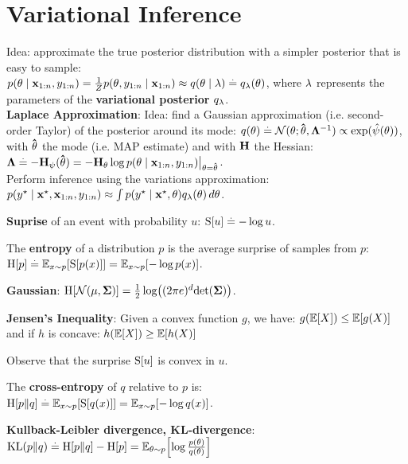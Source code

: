 \section{Variational Inference}
Idea: approximate the true posterior distribution with a simpler posterior that is easy to sample: \\$p(\mathbf{\theta} \mid \mathbf{x}_{1:n}, y_{1:n}) = \frac{1}{Z} p(\mathbf{\theta}, y_{1:n} \mid \mathbf{x}_{1:n}) \approx q(\mathbf{\theta} \mid \mathbf{\lambda}) \overset{.}{=} q_{\mathbf{\lambda}}(\mathbf{\theta})$, where $\mathbf{\lambda}$ represents the parameters of the \textbf{variational posterior} $q_{\mathbf{\lambda}}$.\\
\textbf{Laplace Approximation}: Idea: find a Gaussian approximation (i.e. second-order Taylor) of the posterior around its mode:
$q(\vtheta) \defeq \N[\vtheta]{\vthetahat}{\inv{\mLambda}} \propto \exp(\hat{\psi}(\vtheta))$, with $\mathbf{\hat{\theta}}$ the mode (i.e. MAP estimate) and with $\mathbf{H}$ the Hessian: $\mathbf{\Lambda} \overset{.}{=} - \mathbf{H}_\psi(\mathbf{\hat{\theta}}) = - \mathbf{H}_{\mathbf{\theta}} \log p(\mathbf{\theta} \mid \mathbf{x}_{1:n}, y_{1:n}) \bigl|_{\mathbf{\theta} = \mathbf{\hat{\theta}}}$. \\
Perform inference using the variations approximation: $p(y^\star \mid \mathbf{x^\star}, \mathbf{x}_{1:n}, y_{1:n})  \approx \int p(y^\star \mid \mathbf{x^\star}, \mathbf{\theta}) q_{\mathbf{\lambda}}(\mathbf{\theta}) \,d\mathbf{\theta}$.
\begin{framed}
    \textbf{Suprise} of an event with probability $u$: $\S{u} \defeq - \log u$.
\end{framed}
\begin{framed}
    The \textbf{entropy} of a distribution $p$ is the average surprise of samples from $p$:\\
    $\H{p} \defeq \E[x \sim p]{\S{p(x)}} = \E[x \sim p]{- \log p(x)}$.
\end{framed}
\textbf{Gaussian}: $\H{\N{\vmu}{\mSigma}} = \frac{1}{2} \log \parentheses*{(2 \pi e)^d \det{\mSigma}}$.
\begin{framed}
    \textbf{Jensen's Inequality}: Given a convex function $g$, we have:
    $g(\E{X}) \leq \E{g(X)}$ and if $h$ is concave:  $h(\E{X}) \geq \E{h(X)}$
\end{framed}
Observe that the surprise $\S{u}$ is convex in $u$.
\begin{framed}
    The \textbf{cross-entropy} of $q$ relative to $p$ is: \\
    $\crH{p}{q} \defeq \E[x \sim p]{\S{q(x)}} = \E[x \sim p]{- \log q(x)}$.
\end{framed}
\begin{framed}
    \textbf{Kullback-Leibler divergence, KL-divergence}:
    $\KL{p}{q} \defeq \crH{p}{q} - \H{p} = \E[\vtheta \sim p]{\log \frac{p(\vtheta)}{q(\vtheta)}}$
\end{framed}
